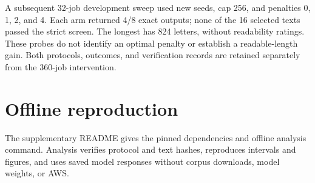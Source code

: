 \documentclass[11pt]{article}
\begin{document}
A subsequent 32-job development sweep used new seeds, cap 256, and penalties 0, 1, 2, and 4. Each arm returned 4/8 exact outputs; none of the 16 selected texts passed the strict screen. The longest has 824 letters, without readability ratings. These probes do not identify an optimal penalty or establish a readable-length gain. Both protocols, outcomes, and verification records are retained separately from the 360-job intervention.

\section{Offline reproduction}
The supplementary README gives the pinned dependencies and offline analysis command. Analysis verifies protocol and text hashes, reproduces intervals and figures, and uses saved model responses without corpus downloads, model weights, or AWS.
\end{document}
